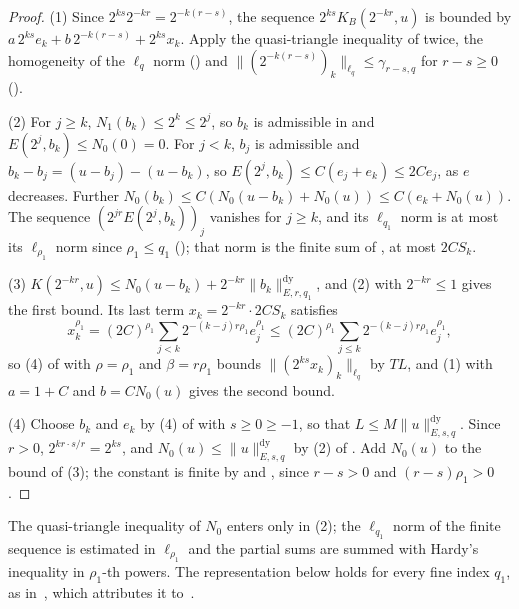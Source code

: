 \begin{proof}
\leanok
{}
(1) Since $2^{ks} 2^{-kr} = 2^{-k(r-s)}$, the sequence $2^{ks} K_B(2^{-kr}, u)$ is bounded by
$a \, 2^{ks} e_k + b \, 2^{-k(r-s)} + 2^{ks} x_k$. Apply the quasi-triangle inequality of
 twice, the homogeneity of the $\ell_q$ norm ()
and $\|(2^{-k(r-s)})_k\|_{\ell_q} \leq \gamma_{r-s, q}$ for $r - s \geq 0$
().

(2) For $j \geq k$, $N_1(b_k) \leq 2^k \leq 2^j$, so $b_k$ is admissible in
 and $E(2^j, b_k) \leq N_0(0) = 0$. For $j < k$, $b_j$ is admissible and
$b_k - b_j = (u - b_j) - (u - b_k)$, so
$E(2^j, b_k) \leq C (e_j + e_k) \leq 2 C e_j$, as $e$ decreases. Further
$N_0(b_k) \leq C (N_0(u - b_k) + N_0(u)) \leq C (e_k + N_0(u))$. The sequence
$(2^{jr} E(2^j, b_k))_j$ vanishes for $j \geq k$, and its $\ell_{q_1}$ norm is at most its
$\ell_{\rho_1}$ norm since $\rho_1 \leq q_1$ (); that norm is the finite sum of
, at most $2 C S_k$.

(3) $K(2^{-kr}, u) \leq N_0(u - b_k) + 2^{-kr} \|b_k\|^{\mathrm{dy}}_{E, r, q_1}$, and (2) with
$2^{-kr} \leq 1$ gives the first bound. Its last term $x_k = 2^{-kr} \cdot 2 C S_k$ satisfies
\[
  x_k^{\rho_1} = (2C)^{\rho_1} \sum_{j < k} 2^{-(k-j) r \rho_1} e_j^{\rho_1}
  \leq (2C)^{\rho_1} \sum_{j \leq k} 2^{-(k-j) r \rho_1} e_j^{\rho_1} ,
\]
so (4) of  with $\rho = \rho_1$ and $\beta = r \rho_1$ bounds
$\|(2^{ks} x_k)_k\|_{\ell_q}$ by $T L$, and (1) with $a = 1 + C$ and $b = C N_0(u)$ gives the
second bound.

(4) Choose $b_k$ and $e_k$ by (4) of  with $s \geq 0 \geq -1$, so that
$L \leq M \|u\|^{\mathrm{dy}}_{E, s, q}$. Since $r > 0$, $2^{k r \cdot s/r} = 2^{ks}$, and
$N_0(u) \leq \|u\|^{\mathrm{dy}}_{E, s, q}$ by (2) of . Add $N_0(u)$ to the
bound of (3); the constant is finite by  and
, since $r - s > 0$ and $(r - s) \rho_1 > 0$.
\end{proof}

The quasi-triangle inequality of $N_0$ enters only in (2); the $\ell_{q_1}$ norm of the
finite sequence is estimated in $\ell_{\rho_1}$ and the partial sums are summed with Hardy's
inequality in $\rho_1$-th powers. The representation below holds for every fine index $q_1$, as
in~\cite[\S 4.3, Theorem~2]{DeVore1998}, which attributes it to~\cite{DeVorePopovLNM}.

